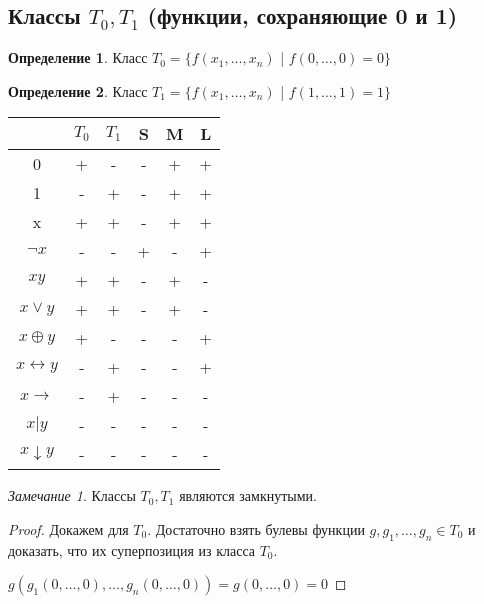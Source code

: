 \documentclass[a4paper]{article}
\theoremstyle{definition}
\newtheorem*{definition}{Определение}
\theoremstyle{remark}
\newtheorem*{remark}{Замечание}
\begin{document}
    \subsection{Классы $T_0, T_1$ (функции, сохраняющие 0 и 1)}
    \begin{definition}
        Класс $T_0 = \{f(x_1,\dots, x_n)$ | $f(0, \dots, 0) = 0\}$
    \end{definition}
    \begin{definition}
        Класс $T_1 = \{f(x_1,\dots, x_n)$ | $f(1, \dots, 1) = 1\}$
    \end{definition}
    \begin{tabular}{c|c|c|c|c|c}
        & $T_0$ & $T_1$ & S & M & L\\
        \hline
        0 & + & - & - & + & +\\
        1 & - & + & - & + & + \\
        x & + & + & - & + & +\\
        $\neg x$ & - & - & +  & - & +\\
        $xy$ & + & + & - & + & -\\
        $x \vee y$ & + & + & - & + & -\\
        $x\oplus y$ & + & - & - & - & +\\
        $x\leftrightarrow y$ & - & + & - & - & +\\
        $x\rightarrow$ & - & + & - & - & -\\
        $x|y$ & - & - & - & - & -\\
        $x\downarrow y$ & - & - & - & - & -\\
    \end{tabular}
    \begin{remark}
        Классы $T_0, T_1$ являются замкнутыми.
    \end{remark}
    \begin{proof}
        Докажем для $T_0$. Достаточно взять булевы функции $g, g_1, \dots, g_n\in T_0$
        и доказать, что их суперпозиция из класса $T_0.$

        $g(g_1 (0, \dots, 0), \dots, g_n(0, \dots, 0)) = g(0, \dots, 0) = 0$
    \end{proof}
\end{document}
